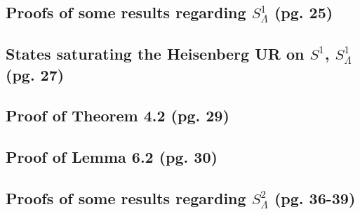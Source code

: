\documentclass{article}
\begin{document}
\subsection{Proofs of some results regarding $S^1_\Lambda$ (pg. 25)}

\subsection{States saturating the Heisenberg UR on $S^1$, $S^1_\Lambda$ (pg. 27)}

\subsection{Proof of Theorem 4.2 (pg. 29)}

\subsection{Proof of Lemma 6.2 (pg. 30)}

\subsection{Proofs of some results regarding $S^2_\Lambda$ (pg. 36-39)}
\end{document}
